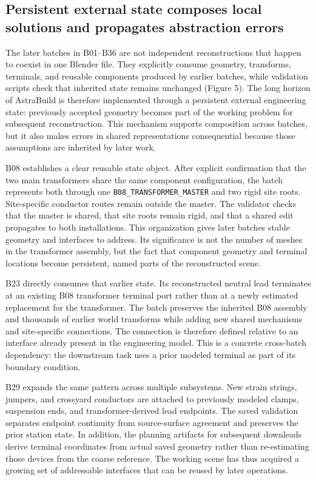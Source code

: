 \documentclass[10pt,a4paper]{article}
\begin{document}
\hypertarget{persistent-external-state-composes-local-solutions-and-propagates-abstraction-errors}{%
\subsection{Persistent external state composes local solutions and
propagates abstraction
errors}\label{persistent-external-state-composes-local-solutions-and-propagates-abstraction-errors}}

The later batches in B01--B36 are not independent reconstructions that
happen to coexist in one Blender file. They explicitly consume geometry,
transforms, terminals, and reusable components produced by earlier
batches, while validation scripts check that inherited state remains
unchanged (Figure 5). The long horizon of AstraBuild is therefore
implemented through a persistent external engineering state: previously
accepted geometry becomes part of the working problem for subsequent
reconstruction. This mechanism supports composition across batches, but
it also makes errors in shared representations consequential because
those assumptions are inherited by later work.

B08 establishes a clear reusable state object. After explicit
confirmation that the two main transformers share the same component
configuration, the batch represents both through one
\texttt{B08\_TRANSFORMER\_MASTER} and two rigid site roots.
Site-specific conductor routes remain outside the master. The validator
checks that the master is shared, that site roots remain rigid, and that
a shared edit propagates to both installations. This organization gives
later batches stable geometry and interfaces to address. Its
significance is not the number of meshes in the transformer assembly,
but the fact that component geometry and terminal locations become
persistent, named parts of the reconstructed scene.

B23 directly consumes that earlier state. Its reconstructed neutral lead
terminates at an existing B08 transformer terminal port rather than at a
newly estimated replacement for the transformer. The batch preserves the
inherited B08 assembly and thousands of earlier world transforms while
adding new shared mechanisms and site-specific connections. The
connection is therefore defined relative to an interface already present
in the engineering model. This is a concrete cross-batch dependency: the
downstream task uses a prior modeled terminal as part of its boundary
condition.

B29 expands the same pattern across multiple subsystems. New strain
strings, jumpers, and crossyard conductors are attached to previously
modeled clamps, suspension ends, and transformer-derived lead endpoints.
The saved validation separates endpoint continuity from source-surface
agreement and preserves the prior station state. In addition, the
planning artifacts for subsequent downleads derive terminal coordinates
from actual saved geometry rather than re-estimating those devices from
the coarse reference. The working scene has thus acquired a growing set
of addressable interfaces that can be reused by later operations.
\end{document}
